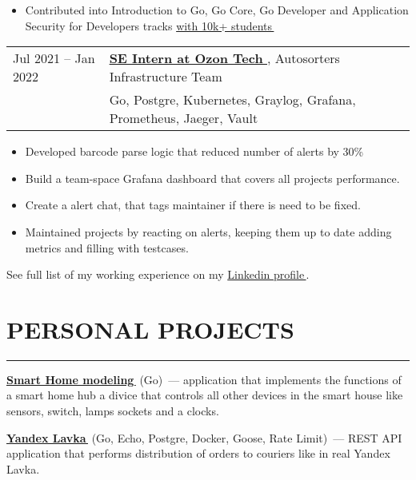 \documentclass[11pt]{res} %
\let\orighref\href
\renewcommand{\href}[2]{\orighref{#1}{#2\,\faExternalLink}}
\begin{document}
\begin{resume}
        \begin{itemize} \itemsep -2pt
            \item Contributed into Introduction to Go, Go Core, Go Developer and Application Security for Developers tracks \href{https://hyperskill.org/tracks/25?category=12}{with 10k+ students}
        \end{itemize}

        \begin{tabular}{ll}
            Jul 2021 -- Jan 2022 \quad & \textbf{\href{https://ozon.tech/}{SE Intern at Ozon Tech}}, Autosorters Infrastructure Team \\
            & Go, Postgre, Kubernetes, Graylog, Grafana, Prometheus, Jaeger, Vault \\
        \end{tabular}

        \begin{itemize} \itemsep -2pt
            \item Developed barcode parse logic that reduced number of alerts by 30\%
            \item Build a team-space Grafana dashboard that covers all projects performance.
            \item Create a alert chat, that tags maintainer if there is need to be fixed.  
            \item Maintained projects by reacting on alerts, keeping them up to date adding metrics and filling with testcases.
        \end{itemize}

        See full list of my working experience on my \href{linkedin.com/in/misterzurg/}{Linkedin profile}.


        \section{\uppercase{Personal Projects}}
        \begin{spacing}{0.3}
            \textcolor[RGB]{220,220,220}{\rule{\linewidth}{0.4pt}}
        \end{spacing}
        \textbf{\href{https://github.com/MisterZurg/edu_tinkoff_Backend-Academy-2023/tree/dungeon-master/Go-laguage-part}{Smart Home modeling}} (Go)~--- application that implements the functions of a smart home hub a divice that controls all other devices in the smart house like sensors, switch, lamps sockets and a clocks.
        
        \textbf{\href{https://github.com/MisterZurg/academy_yandex_Backend-School-2023/tree/master/product}{Yandex Lavka}} (Go, Echo, Postgre, Docker, Goose, Rate Limit)~--- REST API application that performs distribution of orders to couriers like in real Yandex Lavka.
        

\end{resume}
\end{document}
